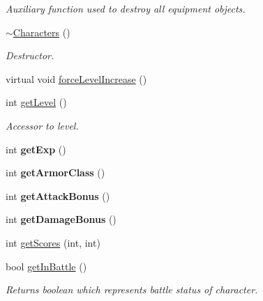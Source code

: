 \begin{DoxyCompactItemize}
\begin{DoxyCompactList}\small\item\em Auxiliary function used to destroy all equipment objects. \end{DoxyCompactList}\item 
\hypertarget{class_characters_a4aea85daea3f08b8b933e82cd42b3109}{}\label{class_characters_a4aea85daea3f08b8b933e82cd42b3109} 
\hyperlink{class_characters_a4aea85daea3f08b8b933e82cd42b3109}{$\sim$\+Characters} ()
\begin{DoxyCompactList}\small\item\em Destructor. \end{DoxyCompactList}\item 
virtual void \hyperlink{class_characters_ac5909582bf15fe17b7a6fa5104c26dd6}{force\+Level\+Increase} ()
\item 
\hypertarget{class_characters_a4d7ffd0091e9e37d6da1ad0f0ceaa48f}{}\label{class_characters_a4d7ffd0091e9e37d6da1ad0f0ceaa48f} 
int \hyperlink{class_characters_a4d7ffd0091e9e37d6da1ad0f0ceaa48f}{get\+Level} ()
\begin{DoxyCompactList}\small\item\em Accessor to level. \end{DoxyCompactList}\item 
\hypertarget{class_characters_a99a23168abd1c344526a719785d7d25c}{}\label{class_characters_a99a23168abd1c344526a719785d7d25c} 
int {\bfseries get\+Exp} ()
\item 
\hypertarget{class_characters_a5651101b826dc12d181dc91fc2830ce9}{}\label{class_characters_a5651101b826dc12d181dc91fc2830ce9} 
int {\bfseries get\+Armor\+Class} ()
\item 
\hypertarget{class_characters_a778d70b709d5a119c2cb7f051fe5f7dc}{}\label{class_characters_a778d70b709d5a119c2cb7f051fe5f7dc} 
int {\bfseries get\+Attack\+Bonus} ()
\item 
\hypertarget{class_characters_a8c6138b3dcb05fc26952f78dad8d6296}{}\label{class_characters_a8c6138b3dcb05fc26952f78dad8d6296} 
int {\bfseries get\+Damage\+Bonus} ()
\item 
int \hyperlink{class_characters_a498fb8e0caaa6503fbb1e1694a082c4c}{get\+Scores} (int, int)
\item 
\hypertarget{class_characters_a2d6d1b6c6fbf0af1dabcbfe5a5975153}{}\label{class_characters_a2d6d1b6c6fbf0af1dabcbfe5a5975153} 
bool \hyperlink{class_characters_a2d6d1b6c6fbf0af1dabcbfe5a5975153}{get\+In\+Battle} ()
\begin{DoxyCompactList}\small\item\em Returns boolean which represents battle status of character. \end{DoxyCompactList}\item 

\end{DoxyCompactItemize}
